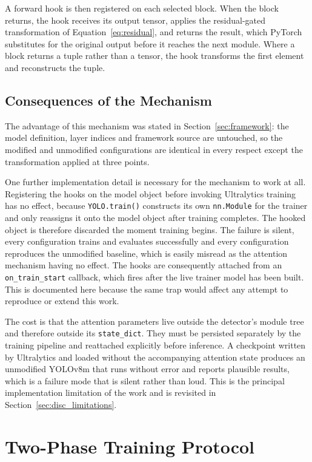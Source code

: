 \documentclass[MScCS]{uccthesis}
\begin{document}
A forward hook is then registered on each selected block. When the block
returns, the hook receives its output tensor, applies the residual-gated
transformation of Equation~\eqref{eq:residual}, and returns the result, which
PyTorch substitutes for the original output before it reaches the next module.
Where a block returns a tuple rather than a tensor, the hook transforms the
first element and reconstructs the tuple.

\subsection{Consequences of the Mechanism}

The advantage of this mechanism was stated in
Section~\ref{sec:framework}: the model definition, layer indices and framework
source are untouched, so the modified and unmodified configurations are
identical in every respect except the transformation applied at three points.

One further implementation detail is necessary for the mechanism to work at
all. Registering the hooks on the model object before invoking Ultralytics
training has no effect, because \texttt{YOLO.train()} constructs its own
\texttt{nn.Module} for the trainer and only reassigns it onto the model object
after training completes. The hooked object is therefore discarded the moment
training begins. The failure is silent, every configuration trains and
evaluates successfully and every configuration reproduces the unmodified
baseline, which is easily misread as the attention mechanism having no
effect. The hooks are consequently attached from an \texttt{on\_train\_start}
callback, which fires after the live trainer model has been built. This is
documented here because the same trap would affect any attempt to reproduce or
extend this work.

The cost is that the attention parameters live outside the detector's module
tree and therefore outside its \texttt{state\_dict}. They must be persisted
separately by the training pipeline and reattached explicitly before inference.
A checkpoint written by Ultralytics and loaded without the accompanying
attention state produces an unmodified YOLOv8m that runs without error and
reports plausible results, which is a failure mode that is silent rather than
loud. This is the principal implementation limitation of the work and is
revisited in Section~\ref{sec:disc_limitations}.

\section{Two-Phase Training Protocol}
\label{sec:training}
\end{document}
